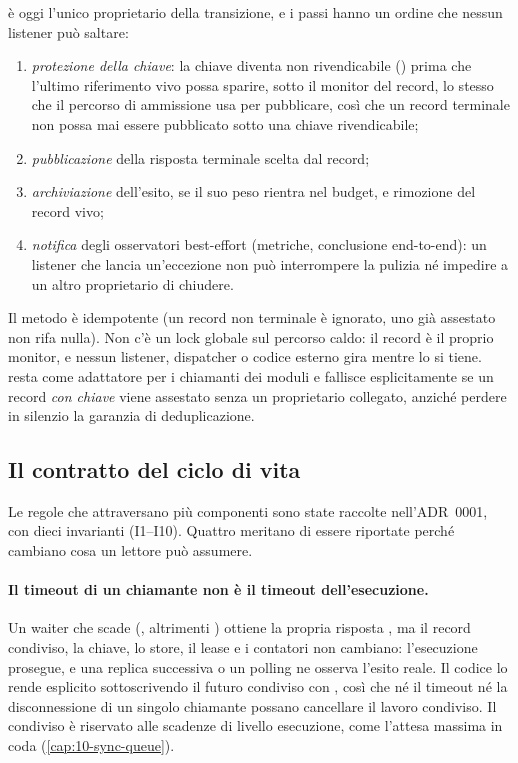  \`e oggi l'unico proprietario della transizione, e
i passi hanno un ordine che nessun listener pu\`o saltare:

\begin{enumerate}
  \item \emph{protezione della chiave}: la chiave diventa non rivendicabile
    () prima che l'ultimo riferimento vivo possa sparire, sotto
    il monitor del record, lo stesso che il percorso di ammissione usa per
    pubblicare, cos\`i che un record terminale non possa mai essere pubblicato sotto
    una chiave rivendicabile;
  \item \emph{pubblicazione} della risposta terminale scelta dal record;
  \item \emph{archiviazione} dell'esito, se il suo peso rientra nel budget, e
    rimozione del record vivo;
  \item \emph{notifica} degli osservatori best-effort (metriche, conclusione
    end-to-end): un listener che lancia un'eccezione non pu\`o interrompere la
    pulizia n\'e impedire a un altro proprietario di chiudere.
\end{enumerate}

Il metodo \`e idempotente (un record non terminale \`e ignorato, uno gi\`a assestato
non rifa nulla). Non c'\`e un lock globale sul percorso caldo: il record \`e il proprio
monitor, e nessun listener, dispatcher o codice esterno gira mentre lo si tiene.
 resta come adattatore per i chiamanti dei moduli e
fallisce esplicitamente se un record \emph{con chiave} viene assestato senza un
proprietario collegato, anzich\'e perdere in silenzio la garanzia di deduplicazione.

\subsection{Il contratto del ciclo di vita}

Le regole che attraversano pi\`u componenti sono state raccolte nell'ADR~0001, con
dieci invarianti (I1--I10). Quattro meritano di essere riportate perch\'e
cambiano cosa un lettore pu\`o assumere.

\paragraph{Il timeout di un chiamante non \`e il timeout dell'esecuzione.}
Un waiter che scade (, altrimenti ) ottiene
la propria risposta , ma il record condiviso, la chiave, lo store, il
lease e i contatori non cambiano: l'esecuzione prosegue, e una replica successiva
o un polling ne osserva l'esito reale. Il codice lo rende esplicito
sottoscrivendo il futuro condiviso con , cos\`i che n\'e il
timeout n\'e la disconnessione di un singolo chiamante possano cancellare il lavoro
condiviso. Il  condiviso \`e riservato alle scadenze di livello
esecuzione, come l'attesa massima in coda (\cref{cap:10-sync-queue}).

